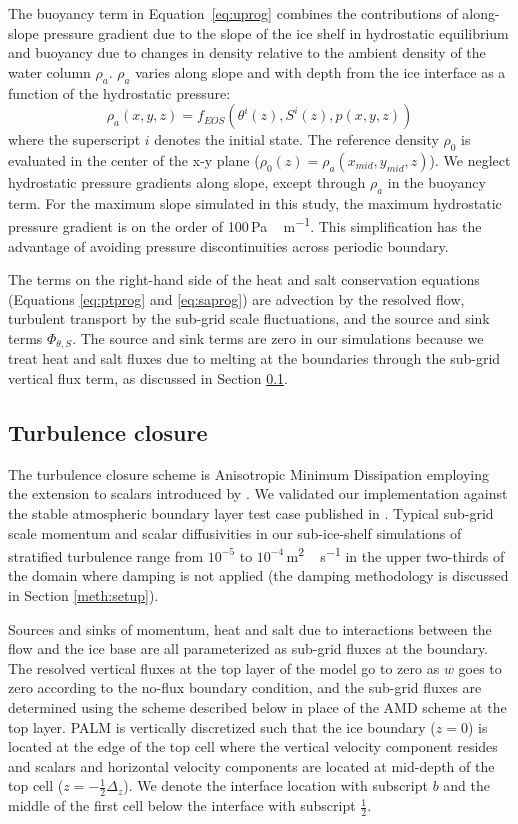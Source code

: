 \documentclass[tc, manuscript]{copernicus}
\begin{document}
The buoyancy term in Equation~\ref{eq:uprog} combines the contributions of along-slope pressure gradient due to the slope of the ice shelf in hydrostatic equilibrium and buoyancy due to changes in density relative to the ambient density of the water column $\rho_a$. $\rho_a$ varies along slope and with depth from the ice interface as a function of the hydrostatic pressure:
\begin{equation}
    \rho_a(x,y,z) = f_{EOS}\left(\theta^i(z),S^i(z),p(x,y,z)\right)
\end{equation}
where the superscript $i$ denotes the initial state. The reference density $\rho_0$ is evaluated in the center of the x-y plane ($\rho_0(z) = \rho_a(x_{mid},y_{mid},z)$). We neglect hydrostatic pressure gradients along slope, except through $\rho_a$ in the buoyancy term. For the maximum slope simulated in this study, the maximum hydrostatic pressure gradient is on the order of 100\,\unit{Pa\,m^{-1}}. This simplification has the advantage of avoiding pressure discontinuities across periodic boundary. 

The terms on the right-hand side of the heat and salt conservation equations (Equations \ref{eq:ptprog} and \ref{eq:saprog}) are advection by the resolved flow, turbulent transport by the sub-grid scale fluctuations, and the source and sink terms  $\Phi_{\theta,S}$. The source and sink terms are zero in our simulations because we treat heat and salt fluxes due to melting at the boundaries through the sub-grid vertical flux term, as discussed in Section \ref{meth:tcm}. 


\subsection{Turbulence closure}\label{meth:tcm}

The turbulence closure scheme is Anisotropic Minimum Dissipation \cite[AMD;][]{rozema_minimum-dissipation_2015} employing the extension to scalars introduced by \citet{abkar_minimum-dissipation_2016}. We validated our implementation against the stable atmospheric boundary layer test case published in \citet{abkar_large-eddy_2017}. Typical sub-grid scale momentum and scalar diffusivities in our sub-ice-shelf simulations of stratified turbulence range from $10^{-5}$ to $10^{-4}$\,\unit{m^2\,s^{-1}} in the upper two-thirds of the domain where damping is not applied (the damping methodology is discussed in Section \ref{meth:setup}). 

Sources and sinks of momentum, heat and salt due to interactions between the flow and the ice base are all parameterized as sub-grid fluxes at the boundary. The resolved vertical fluxes at the top layer of the model go to zero as $w$ goes to zero according to the no-flux boundary condition, and the sub-grid fluxes are determined using the scheme described below in place of the AMD scheme at the top layer. PALM is vertically discretized such that the ice boundary ($z=0$) is located at the edge of the top cell where the vertical velocity component resides and scalars and horizontal velocity components are located at mid-depth of the top cell ($z=-\frac{1}{2}\Delta_z$). We denote the interface location with subscript $b$ and the middle of the first cell below the interface with subscript $\frac{1}{2}$.
\end{document}

